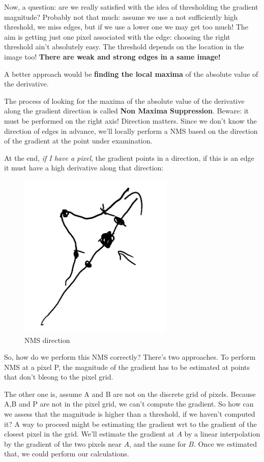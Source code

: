 \documentclass{article}
\begin{document}
Now, a question: are we really satisfied with the idea of thresholding
the gradient magnitude? Probably not that much: assume we use a not
sufficiently high threshold, we miss edges, but if we use a lower one we
may get too much! The aim is getting just one pixel associated with the
edge: choosing the right threshold ain't absolutely easy. The threshold
depends on the location in the image too! \textbf{There are weak and
strong edges in a same image!}

A better approach would be \textbf{finding the local maxima} of the
absolute value of the derivative.

The process of looking for the maxima of the absolute value of the
derivative along the gradient direction is called \textbf{Non Maxima
Suppression}. Beware: it must be performed on the right axis! Direction
matters. Since we don't know the direction of edges in advance, we'll
locally perform a NMS based on the direction of the gradient at the
point under examination.

At the end, \emph{if I have a pixel}, the gradient points in a
direction, if this is an edge it must have a high derivative along that
direction:

\begin{figure}
\centering
\includegraphics{./res/nms-direction.png}
\caption{NMS direction}
\end{figure}

So, how do we perform this NMS correctly? There's two approaches. To
perform NMS at a pixel P, the magnitude of the gradient has to be
estimated at points that don't bleong to the pixel grid.

The other one is, assume A and B are not on the discrete grid of pixels.
Because A,B and P are not in the pixel grid, we can't compute the
gradient. So how can we assess that the magnitude is higher than a
threshold, if we haven't computed it? A way to proceed might be
estimating the gradient wrt to the gradient of the closest pixel in the
grid. We'll estimate the gradient at \(A\) by a linear interpolation by
the gradient of the two pixels near \(A\), and the same for \(B\). Once
we estimated that, we could perform our calculations.
\end{document}
